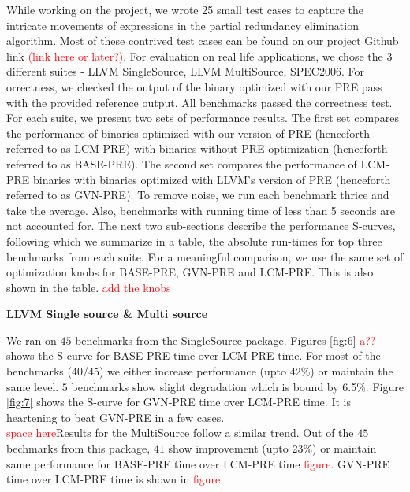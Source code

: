 \documentclass[10pt,twoside]{report}
\begin{document}
While working on the project, we wrote 25 small test cases to capture the intricate movements
of expressions in the partial redundancy elimination algorithm. Most of these contrived test cases can 
be found on our project Github link \textcolor{red}{(link here or later?)}. For evaluation on real life applications, we
chose the 3 different suites - LLVM SingleSource, LLVM MultiSource, SPEC2006. For orrectness, we checked the 
output of the binary optimized with our PRE pass with the provided reference output. All benchmarks passed the 
correctness test. For each suite, we present two sets of performance results. The first set compares the performance
of binaries optimized with our version of PRE (henceforth referred to as LCM-PRE) with binaries without PRE
optimization (henceforth referred to as BASE-PRE). The second set compares the
performance of LCM-PRE binaries with binaries optimized with LLVM's version of
PRE (henceforth referred to as GVN-PRE). To remove noise, we run each benchmark
thrice and take the average. Also, benchmarks with running time of less than 5
seconds are not accounted for. The next two sub-sections describe the
performance S-curves, following which we summarize in a table, the absolute
run-times for top three benchmarks from each suite. For a meaningful comparison,
we use the same set of optimization knobs for BASE-PRE, GVN-PRE and LCM-PRE.
This is also shown in the table. \textcolor{red}{add the knobs}

\begin{flushleft}
\textbf{\normalsize{LLVM Single source \& Multi source}}
\end{flushleft}

We ran on $45$ benchmarks from the SingleSource package. Figures \ref{fig:6} \textcolor{red}{a??} shows the S-curve for BASE-PRE time over LCM-PRE time. For most of the benchmarks (40/45) we either increase performance (upto 42\%) or maintain the same level. $5$ benchmarks show slight degradation which is bound by 6.5\%. Figure \ref{fig:7} shows the S-curve for GVN-PRE time over LCM-PRE time. It is heartening to beat GVN-PRE in a few cases. \\
\textcolor{red}{space here}Results for the MultiSource follow a similar trend. Out of the $45$ bechmarks from this package, $41$ show improvement (upto 23\%) or maintain same performance for BASE-PRE time over LCM-PRE time \textcolor{red}{figure}. GVN-PRE time over LCM-PRE time is shown in \textcolor{red}{figure}.
\end{document}
